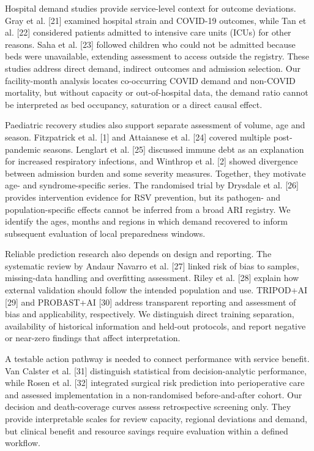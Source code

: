 \documentclass[11pt,a4paper]{article}
\newcommand{\subheading}[1]{\par\needspace{3\baselineskip}\vspace{5pt}{\bfseries #1}\par\vspace{1pt}}
\begin{document}
Hospital demand studies provide service-level context for outcome deviations. Gray et al. [21] examined hospital strain and COVID-19 outcomes, while Tan et al. [22] considered patients admitted to intensive care units (ICUs) for other reasons. Saha et al. [23] followed children who could not be admitted because beds were unavailable, extending assessment to access outside the registry. These studies address direct demand, indirect outcomes and admission selection. Our facility-month analysis locates co-occurring COVID demand and non-COVID mortality, but without capacity or out-of-hospital data, the demand ratio cannot be interpreted as bed occupancy, saturation or a direct causal effect.

Paediatric recovery studies also support separate assessment of volume, age and season. Fitzpatrick et al. [1] and Attaianese et al. [24] covered multiple post-pandemic seasons. Lenglart et al. [25] discussed immune debt as an explanation for increased respiratory infections, and Winthrop et al. [2] showed divergence between admission burden and some severity measures. Together, they motivate age- and syndrome-specific series. The randomised trial by Drysdale et al. [26] provides intervention evidence for RSV prevention, but its pathogen- and population-specific effects cannot be inferred from a broad ARI registry. We identify the ages, months and regions in which demand recovered to inform subsequent evaluation of local preparedness windows.

\subheading{2.4 From predictive performance to testable service value}
Reliable prediction research also depends on design and reporting. The systematic review by Andaur Navarro et al. [27] linked risk of bias to samples, missing-data handling and overfitting assessment. Riley et al. [28] explain how external validation should follow the intended population and use. TRIPOD+AI [29] and PROBAST+AI [30] address transparent reporting and assessment of bias and applicability, respectively. We distinguish direct training separation, availability of historical information and held-out protocols, and report negative or near-zero findings that affect interpretation.

A testable action pathway is needed to connect performance with service benefit. Van Calster et al. [31] distinguish statistical from decision-analytic performance, while Rosen et al. [32] integrated surgical risk prediction into perioperative care and assessed implementation in a non-randomised before-and-after cohort. Our decision and death-coverage curves assess retrospective screening only. They provide interpretable scales for review capacity, regional deviations and demand, but clinical benefit and resource savings require evaluation within a defined workflow.
\end{document}
